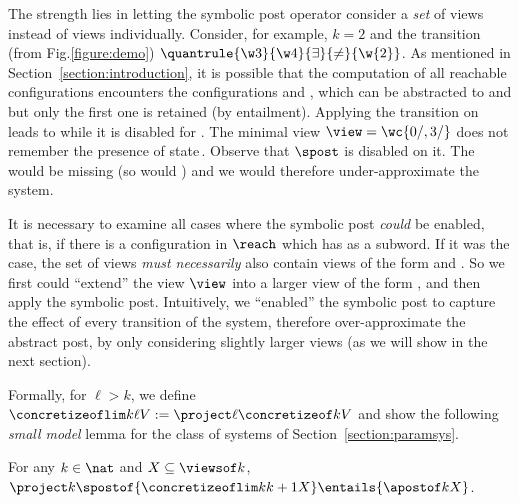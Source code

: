 The strength lies in letting the symbolic post operator consider a
\emph{set} of views instead of views individually.
%
Consider, for example, $k=2$ and the transition (from
Fig.\ref{figure:demo}) %
$\quantrule{\w 3}{\w 4}{\exists}{\neq}{\w{2}}$.
%
As mentioned in Section~\ref{section:introduction}, it is possible
that the computation of all reachable configurations encounters the
configurations  and , which can be
abstracted to  and  but only the first
one is retained (by entailment).
%
Applying the transition on  leads to
 while it is disabled for . The
minimal view $\view = \wc{0/,3/}$ does not remember the presence of
state\,. Observe that $\spost$ is disabled on it.
%
The  would be missing (so would ) and
we would therefore under-approximate the system.

It is necessary to examine all cases where the symbolic post
\emph{could} be enabled, that is, if there is a configuration in
$\reach$ which has  as a subword.
%
If it was the case, the set of views \emph{must necessarily} also
contain views of the form  and .
%
So we first could ``extend'' the view $\view$ into a larger view of
the form , and then apply the symbolic post.
%
Intuitively, we ``enabled'' the symbolic post to capture the effect of
every transition of the system, therefore over-approximate the
abstract post, by only considering slightly larger views (as we will
show in the next section).

Formally, for $\ell > k$, we define %
$\concretizeoflim k \ell V := \project \ell {\concretizeof k V}$ %
and show the following {\it small model} lemma for the class of
systems of Section~\ref{section:paramsys}.
%
\begin{lemma}
\label{lemma:apost}
For any $k\in\nat$ and $X\subseteq\viewsof k$,
${\project k {\spostof{\concretizeoflim k {k+1} X}}}\entails{\apostof k X} $.
\end{lemma}

